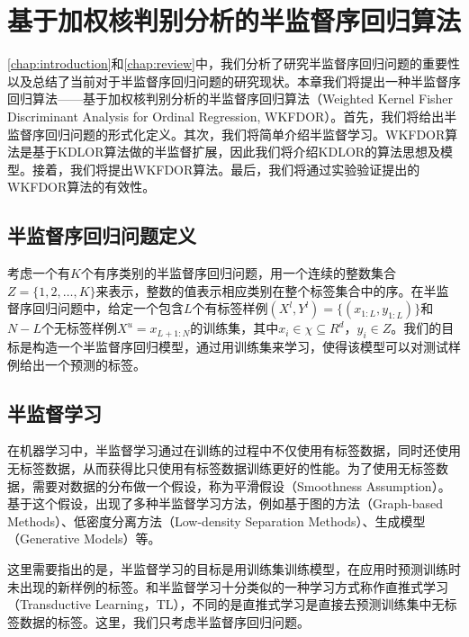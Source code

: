 \chapter{基于加权核判别分析的半监督序回归算法}
\label{chap:wkfdor}

\autoref{chap:introduction}和\autoref{chap:review}中，我们分析了研究半监督序回归问题的重要性以及总结了当前对于半监督序回归问题的研究现状。本章我们将提出一种半监督序回归算法——基于加权核判别分析的半监督序回归算法（Weighted Kernel Fisher Discriminant Analysis for Ordinal Regression, WKFDOR）。首先，我们将给出半监督序回归问题的形式化定义。其次，我们将简单介绍半监督学习。WKFDOR算法是基于KDLOR算法\citep{sun2010kernel}做的半监督扩展，因此我们将介绍KDLOR的算法思想及模型。接着，我们将提出WKFDOR算法。最后，我们将通过实验验证提出的WKFDOR算法的有效性。

\section{半监督序回归问题定义}
考虑一个有\(K\)个有序类别的半监督序回归问题，用一个连续的整数集合 \(Z=\{1,2,\dots,K\}\)来表示，整数的值表示相应类别在整个标签集合中的序。在半监督序回归问题中，给定一个包含\(L\)个有标签样例\((X^{l},Y^{l})=\{(x_{1:L},y_{1:L})\}\)和\(N-L\)个无标签样例\(X^{u} = {x_{L+1:N}}\)的训练集，其中\(x_{i} \in \chi \subseteq R^{d}\)，\(y_{i} \in Z\)。我们的目标是构造一个半监督序回归模型，通过用训练集来学习，使得该模型可以对测试样例给出一个预测的标签。

\section{半监督学习}
在机器学习中，半监督学习通过在训练的过程中不仅使用有标签数据，同时还使用无标签数据，从而获得比只使用有标签数据训练更好的性能。为了使用无标签数据，需要对数据的分布做一个假设，称为平滑假设（Smoothness Assumption）\citep{chapelle2006semi}。
基于这个假设，出现了多种半监督学习方法，例如基于图的方法（Graph-based Methods）、低密度分离方法（Low-density Separation Methods）、生成模型（Generative Models）等\citep{zhu2005semi}。

这里需要指出的是，半监督学习的目标是用训练集训练模型，在应用时预测训练时未出现的新样例的标签。和半监督学习十分类似的一种学习方式称作直推式学习（Transductive Learning，TL），不同的是直推式学习是直接去预测训练集中无标签数据的标签。这里，我们只考虑半监督序回归问题。

